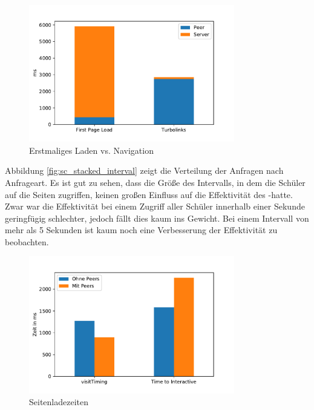 \begin{figure}[!h]
	\centering
	\includegraphics[width=0.8\textwidth]{figures/sc_first_vs_later}
	\caption[Erstmaliges Laden vs. Navigation]{Erstmaliges Laden vs. Navigation}
	\label{fig:sc_first_vs_later}
\end{figure}
Abbildung \ref{fig:sc_stacked_interval} zeigt die Verteilung der Anfragen nach Anfrageart. Es ist gut zu sehen, dass die Größe des Intervalls, in dem die Schüler auf die Seiten zugriffen, keinen großen Einfluss auf die Effektivität des \pTp-\cdn hatte. Zwar war die Effektivität bei einem Zugriff aller Schüler innerhalb einer Sekunde geringfügig schlechter, jedoch fällt dies kaum ins Gewicht. Bei einem Intervall von mehr als 5 Sekunden ist kaum noch eine Verbesserung der Effektivität zu beobachten.
\begin{figure}[!h]
	\centering
	\includegraphics[width=0.8\textwidth]{figures/page_load_sc}
	\caption[Seitenladezeiten]{Seitenladezeiten}
	\label{fig:page_load_sc}
\end{figure}
